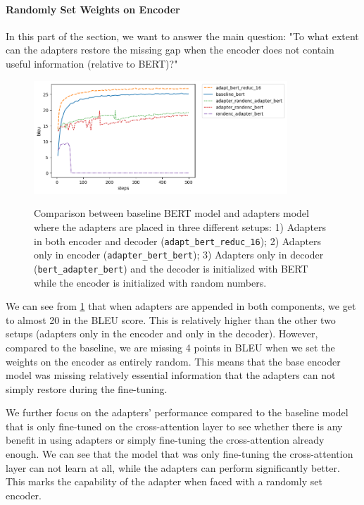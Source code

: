 \paragraph{Randomly Set Weights on Encoder}
In this part of the section, we want to answer the main question: "To what extent can the adapters restore the missing gap when the encoder does not contain useful information (relative to BERT)?"

\begin{figure}[h]
    {\includegraphics[width=0.85\textwidth]{img/adapter_bert_randenc.png}}
    \centering
    \caption[Comparison for model with adapters in the decoder and the encoder is initalized with random weights.]{Comparison between baseline BERT model and adapters model where the adapters are placed in three different setups: 1) Adapters in both encoder and decoder (\texttt{adapt\_bert\_reduc\_16}); 2) Adapters only in encoder (\texttt{adapter\_bert\_bert}); 3) Adapters only in decoder (\texttt{bert\_adapter\_bert}) and the decoder is initialized with BERT while the encoder is initialized with random numbers.}
    \label{img:adapt_bert_randenc}
\end{figure}

We can see from \cref{img:adapt_bert_randenc} that when adapters are appended in both components, we get to almost 20 in the BLEU score. This is relatively higher than the other two setups (adapters only in the encoder and only in the decoder). However, compared to the baseline, we are missing 4 points in BLEU when we set the weights on the encoder as entirely random. This means that the base encoder model was missing relatively essential information that the adapters can not simply restore during the fine-tuning.

We further focus on the adapters' performance compared to the baseline model that is only fine-tuned on the cross-attention layer to see whether there is any benefit in using adapters or simply fine-tuning the cross-attention already enough. We can see that the model that was only fine-tuning the cross-attention layer can not learn at all, while the adapters can perform significantly better. This marks the capability of the adapter when faced with a randomly set encoder.


